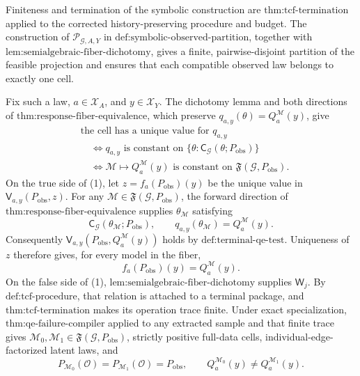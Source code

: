 Finiteness and termination of the symbolic construction are \(\text{thm:tcf-termination}\) applied to the corrected history-preserving procedure and budget. The construction of \(\mathscr P_{\mathcal G,A,Y}\) in \(\text{def:symbolic-observed-partition}\), together with \(\text{lem:semialgebraic-fiber-dichotomy}\), gives a finite, pairwise-disjoint partition of the feasible projection and ensures that each compatible observed law belongs to exactly one cell.

Fix such a law, \(a\in\mathcal X_A\), and \(y\in\mathcal X_Y\). The dichotomy lemma and both directions of \(\text{thm:response-fiber-equivalence}\), which preserve \(q_{a,y}(\theta)=Q_a^{\mathcal M}(y)\), give
\[
\begin{aligned}
&\text{the cell has a unique value for }q_{a,y}\\
&\quad\Longleftrightarrow
q_{a,y}\text{ is constant on }
\{\theta:\mathsf C_{\mathcal G}(\theta;P_{\mathrm{obs}})\}\\
&\quad\Longleftrightarrow
\mathcal M\longmapsto Q_a^{\mathcal M}(y)
\text{ is constant on }\mathfrak F(\mathcal G,P_{\mathrm{obs}}).
\end{aligned}
\tag{1}
\]
On the true side of (1), let \(z=f_a(P_{\mathrm{obs}})(y)\) be the unique value in \(\mathsf V_{a,y}(P_{\mathrm{obs}},z)\). For any \(\mathcal M\in\mathfrak F(\mathcal G,P_{\mathrm{obs}})\), the forward direction of \(\text{thm:response-fiber-equivalence}\) supplies \(\theta_{\mathcal M}\) satisfying
\[
\mathsf C_{\mathcal G}(\theta_{\mathcal M};P_{\mathrm{obs}}),
\qquad
q_{a,y}(\theta_{\mathcal M})=Q_a^{\mathcal M}(y).
\]
Consequently \(\mathsf V_{a,y}(P_{\mathrm{obs}},Q_a^{\mathcal M}(y))\) holds by \(\text{def:terminal-qe-test}\). Uniqueness of \(z\) therefore gives, for every model in the fiber,
\[
f_a(P_{\mathrm{obs}})(y)=Q_a^{\mathcal M}(y).
\tag{2}
\]
On the false side of (1), \(\text{lem:semialgebraic-fiber-dichotomy}\) supplies \(\mathsf W_j\). By \(\text{def:tcf-procedure}\), that relation is attached to a terminal package, and \(\text{thm:tcf-termination}\) makes its operation trace finite. Under exact specialization, \(\text{thm:qe-failure-compiler}\) applied to any extracted sample and that finite trace gives \(\mathcal M_0,\mathcal M_1\in\mathfrak F(\mathcal G,P_{\mathrm{obs}})\), strictly positive full-data cells, individual-edge-factorized latent laws, and
\[
P_{\mathcal M_0}(\mathcal O)=P_{\mathcal M_1}(\mathcal O)=P_{\mathrm{obs}},
\qquad
Q_a^{\mathcal M_0}(y)\neq Q_a^{\mathcal M_1}(y).
\tag{3}
\]

